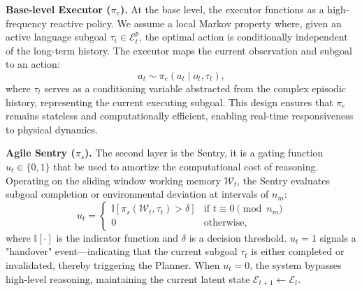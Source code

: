 \textbf{Base-level Executor ($\pi_e$).}
At the base level, the executor functions as a high-frequency reactive policy. We assume a local Markov property where, given an active language subgoal $\tau_t \in \mathcal{E}_t^p$, the optimal action is conditionally independent of the long-term history. The executor maps the current observation and subgoal to an action:
\begin{equation}
    a_t \sim \pi_e(a_t \mid o_t, \tau_t),
\end{equation}
where $\tau_t$ serves as a conditioning variable abstracted from the complex episodic history, representing the current executing subgoal. This design ensures that $\pi_e$ remains stateless and computationally efficient, enabling real-time responsiveness to physical dynamics.

\textbf{Agile Sentry ($\pi_s$).}
The second layer is the Sentry, it is a gating function $u_t \in \{0, 1\}$ that be used to amortize the computational cost of reasoning. Operating on the sliding window working memory $\mathcal{W}_t$, the Sentry evaluates subgoal completion or environmental deviation at intervals of $n_m$:
\begin{equation}
    u_t = 
    \begin{cases} 
    \mathbb{I}[\pi_s(\mathcal{W}_t, \tau_t) > \delta] & \text{if } t \equiv 0 \pmod{n_m} \\
    0 & \text{otherwise,}
    \end{cases}
\end{equation}
where $\mathbb{I}[\cdot]$ is the indicator function and $\delta$ is a decision threshold. $u_t=1$ signals a "handover" event—indicating that the current subgoal $\tau_t$ is either completed or invalidated, thereby triggering the Planner. When $u_t=0$, the system bypasses high-level reasoning, maintaining the current latent state $\mathcal{E}_{t+1} \leftarrow \mathcal{E}_t$.


